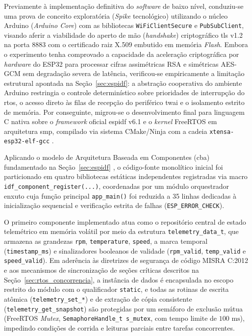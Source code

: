 \documentclass[
	12pt,				%
	openright,			%
	twoside,			%
	a4paper,			%
	english,			%
	brazil				%
	]{abntex2}
\begin{document}
Previamente à implementação definitiva do \textit{software} de baixo nível, conduziu-se
uma prova de conceito exploratória (\textit{Spike} tecnológico) utilizando o núcleo
Arduino (\textit{Arduino Core}) com as bibliotecas \texttt{WiFiClientSecure} e
\texttt{PubSubClient}, visando aferir a viabilidade do aperto de mão
(\textit{handshake}) criptográfico \acrshort{tls} v1.2 na porta 8883 com o certificado
raiz X.509 embutido em memória \textit{Flash}. Embora o experimento tenha comprovado a
capacidade da aceleração criptográfica por \textit{hardware} do ESP32 para processar
cifras assimétricas RSA e simétricas AES-GCM sem degradação severa de latência,
verificou-se empiricamente a limitação estrutural apontada na Seção~\ref{sec:espidf}: a
abstração cooperativa do ambiente Arduino restringia o controle determinístico sobre
prioridades de interrupção do \acrshort{rtos}, o acesso direto às filas de recepção do
periférico \acrshort{twai} e o isolamento estrito de memória. Por conseguinte, migrou-se
o desenvolvimento final para linguagem C nativa sobre o \textit{framework} oficial
\acrshort{espidf} v6.1 e o \textit{kernel} FreeRTOS em arquitetura \acrshort{smp},
compilado via sistema CMake/Ninja com a cadeia \texttt{xtensa-esp32-elf-gcc}
\cite{espressif2026}.

Aplicando o modelo de Arquitetura Baseada em Componentes (\acrshort{cba}) fundamentado
na Seção~\ref{sec:espidf} \cite{iso42010}, o código-fonte monolítico inicial foi
particionado em quatro bibliotecas estáticas independentes registradas via macro
\texttt{idf\_component\_register(...)}, coordenadas por um módulo orquestrador enxuto
cuja função principal \texttt{app\_main()} foi reduzida a 35 linhas dedicadas à
inicialização sequencial e verificação estrita de falhas (\texttt{ESP\_ERROR\_CHECK}).

O
primeiro componente implementado atua como o repositório central de estado telemétrico
em memória volátil por meio da estrutura \texttt{telemetry\_\allowbreak data\_t}, que
armazena as grandezas \texttt{rpm}, \texttt{temperature}, \texttt{speed}, a marca
temporal (\texttt{timestamp\_ms}) e sinalizadores booleanos de validade
(\texttt{rpm\_valid}, \texttt{temp\_\allowbreak valid} e \texttt{speed\_valid}). Em
aderência às diretrizes de segurança de código MISRA C:2012 \cite{misra2013} e aos
mecanismos de sincronização de seções críticas descritos na
Seção~\ref{sec:rtos_concorrencia}, a instância de dados é encapsulada no escopo restrito
do módulo com o qualificador \texttt{static}, e todas as rotinas de escrita atômica
(\texttt{telemetry\_set\_*}) e de extração de cópia consistente
(\texttt{telemetry\_\allowbreak get\_snapshot}) são protegidas por um semáforo de
exclusão mútua (FreeRTOS \textit{Mutex}, \texttt{Semaphore\allowbreak Handle\_t
s\_mutex}, com tempo limite de $100\text{ ms}$), impedindo condições de corrida e
leituras parciais entre tarefas concorrentes.
\end{document}
